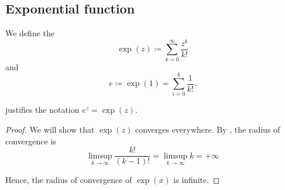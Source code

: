 \subsection{Exponential function}\label{subsec:exponential_function}

\begin{definition}\label{def:exponential_function}
  We define the 
  \begin{equation}\label{def:exponential_function/series}
    \exp(z) \coloneqq \sum_{k=0}^\infty \frac {z^k} {k!}
  \end{equation}
  and 
  \begin{equation*}
    e \coloneqq \exp(1) = \sum_{i=0}^k \frac 1 {k!}.
  \end{equation*}

   justifies the notation \( e^z = \exp(z) \).
\end{definition}
\begin{proof}
  We will show that \( \exp(z) \) converges everywhere. By , the radius of convergence is
  \begin{equation*}
    \limsup_{k \to \infty} \frac {k!} {(k-1)!}
    =
    \limsup_{k \to \infty} k
    =
    +\infty
  \end{equation*}

  Hence, the radius of convergence of \( \exp(x) \) is infinite.
\end{proof}

